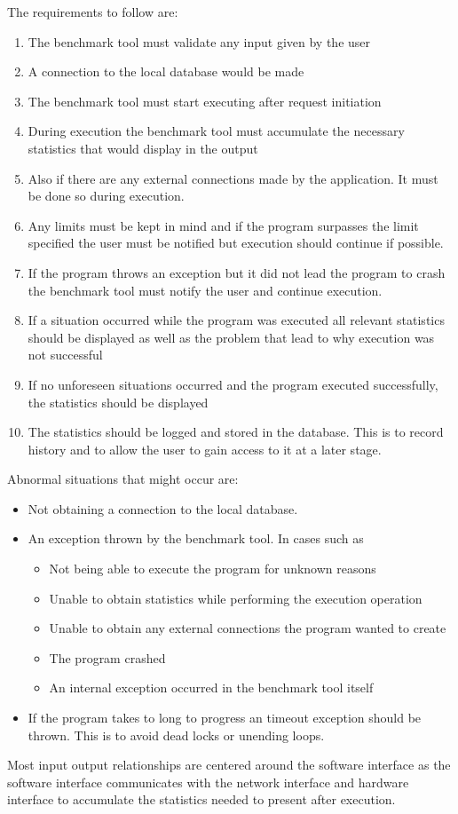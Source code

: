 \documentclass[a4paper,12pt]{article}
\begin{document}
 The requirements to follow are:
\begin{enumerate}
\item The benchmark tool must validate any input given by the user
\item A connection to the local database would be made
\item The benchmark tool must start executing after request initiation
\item During execution the benchmark tool must accumulate the necessary statistics that would display in the output
\item Also if there are any external connections made by the application. It must be done so during execution. 
\item Any limits must be kept in mind and if the program surpasses the limit specified the user must be notified but execution should continue if possible.
\item  If the program throws an exception but it did not lead the program to crash the benchmark tool must notify the user and continue execution.
\item If a situation occurred while the program was executed all relevant statistics should be displayed as well as the problem that lead to why execution was not successful
\item If no unforeseen situations occurred and the program executed successfully, the statistics should be displayed
\item The statistics should be logged and stored in the database. This is to record history and to allow the user to gain access to it at a later stage.
\end{enumerate}

Abnormal situations that might occur are:
\begin{itemize}
\item Not obtaining a connection to the local database. 
\item An exception thrown by the benchmark tool. In cases such as
\begin{itemize}
\item Not being able to execute the program for unknown reasons 
\item Unable to obtain statistics while performing the execution operation
\item Unable to obtain any external connections the program wanted to create
\item The program crashed 
\item An internal exception occurred in the benchmark tool itself
\end{itemize}
\item If the program takes to long to progress an timeout exception should be thrown. This is to avoid dead locks or unending loops.
 
\end{itemize}
Most input output relationships are centered around the software interface as the software interface communicates with the network interface and hardware interface to accumulate the statistics needed to present after execution. 
\end{document}
